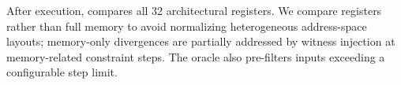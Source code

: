 After execution, \tool compares all 32 architectural registers. We compare registers rather than full memory to avoid normalizing heterogeneous address-space layouts; memory-only divergences are partially addressed by witness injection at memory-related constraint steps. The oracle also pre-filters inputs exceeding a configurable step limit.

